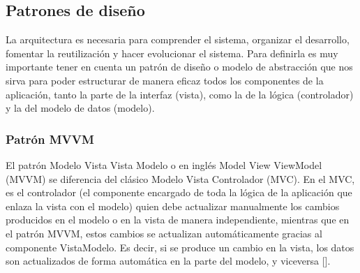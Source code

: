 %

\subsection{Patrones de diseño}

La arquitectura es necesaria para comprender el sistema, organizar el desarrollo, fomentar la reutilización y hacer evolucionar el sistema. Para definirla es muy importante tener en cuenta un patrón de diseño o modelo de abstracción que nos sirva para poder estructurar de manera eficaz todos los componentes de la aplicación, tanto la parte de la interfaz (vista), como la de la lógica (controlador) y la del modelo de datos (modelo).


\subsubsection{Patrón MVVM}

El patrón Modelo Vista Vista Modelo o en inglés Model View ViewModel (MVVM) se diferencia del clásico Modelo Vista Controlador (MVC). En el
MVC, es el controlador (el componente encargado de toda la lógica de la aplicación que enlaza la vista con el modelo) quien debe actualizar manualmente los cambios producidos en el modelo o en la vista de manera independiente, mientras que en el patrón MVVM, estos cambios se actualizan automáticamente gracias al componente VistaModelo. Es decir, si se produce un cambio en la vista, los datos son actualizados de forma automática en la parte del modelo, y viceversa [\cite{45}].

